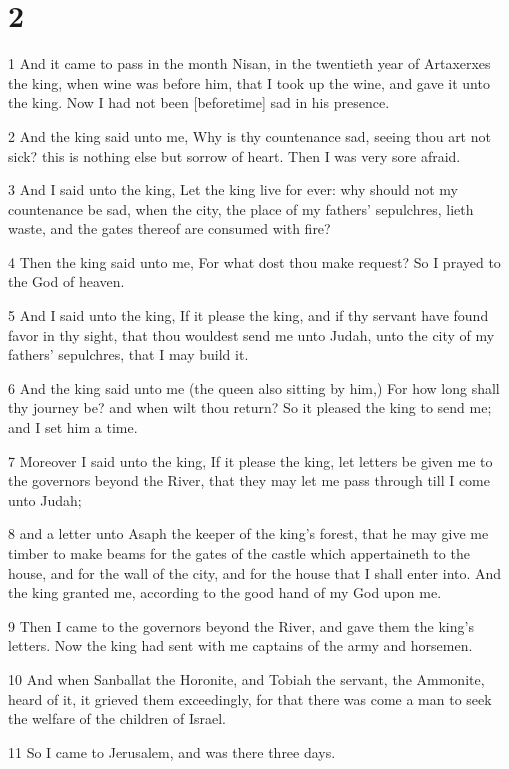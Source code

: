 \chapter{2}

\par 1 And it came to pass in the month Nisan, in the twentieth year of Artaxerxes the king, when wine was before him, that I took up the wine, and gave it unto the king. Now I had not been [beforetime] sad in his presence.
\par 2 And the king said unto me, Why is thy countenance sad, seeing thou art not sick? this is nothing else but sorrow of heart. Then I was very sore afraid.
\par 3 And I said unto the king, Let the king live for ever: why should not my countenance be sad, when the city, the place of my fathers' sepulchres, lieth waste, and the gates thereof are consumed with fire?
\par 4 Then the king said unto me, For what dost thou make request? So I prayed to the God of heaven.
\par 5 And I said unto the king, If it please the king, and if thy servant have found favor in thy sight, that thou wouldest send me unto Judah, unto the city of my fathers' sepulchres, that I may build it.
\par 6 And the king said unto me (the queen also sitting by him,) For how long shall thy journey be? and when wilt thou return? So it pleased the king to send me; and I set him a time.
\par 7 Moreover I said unto the king, If it please the king, let letters be given me to the governors beyond the River, that they may let me pass through till I come unto Judah;
\par 8 and a letter unto Asaph the keeper of the king's forest, that he may give me timber to make beams for the gates of the castle which appertaineth to the house, and for the wall of the city, and for the house that I shall enter into. And the king granted me, according to the good hand of my God upon me.
\par 9 Then I came to the governors beyond the River, and gave them the king's letters. Now the king had sent with me captains of the army and horsemen.
\par 10 And when Sanballat the Horonite, and Tobiah the servant, the Ammonite, heard of it, it grieved them exceedingly, for that there was come a man to seek the welfare of the children of Israel.
\par 11 So I came to Jerusalem, and was there three days.
